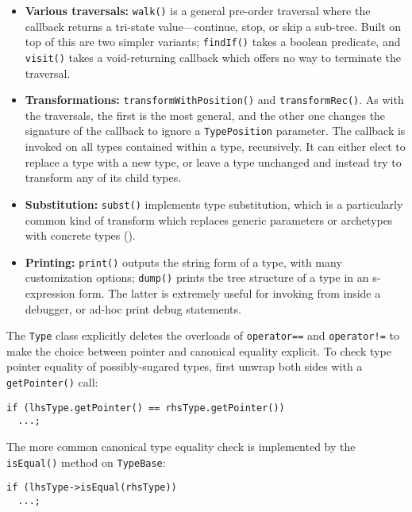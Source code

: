 \documentclass[../generics]{subfiles}
\begin{document}
\begin{itemize}
\item \textbf{Various traversals:} \texttt{walk()} is a general pre-order traversal where the callback returns a tri-state value---continue, stop, or skip a sub-tree. Built on top of this are two simpler variants; \texttt{findIf()} takes a boolean predicate, and \texttt{visit()} takes a void-returning callback which offers no way to terminate the traversal.
\item \textbf{Transformations:} \texttt{transformWithPosition()} and \texttt{transformRec()}. As with the traversals, the first is the most general, and the other one changes the signature of the callback to ignore a \texttt{TypePosition} parameter. The callback is invoked on all types contained within a type, recursively. It can either elect to replace a type with a new type, or leave a type unchanged and instead try to transform any of its child types.
\item \textbf{Substitution:} \texttt{subst()} implements type substitution, which is a particularly common kind of transform which replaces generic parameters or archetypes with concrete types ().
\item \textbf{Printing:} \texttt{print()} outputs the string form of a type, with many customization options; \texttt{dump()} prints the tree structure of a type in an s-expression form. The latter is extremely useful for invoking from inside a debugger, or ad-hoc print debug statements.
\end{itemize}
The \texttt{Type} class explicitly deletes the overloads of \texttt{operator==} and \texttt{operator!=} to make the choice between pointer and canonical equality explicit. To check type pointer equality of possibly-sugared types, first unwrap both sides with a \texttt{getPointer()} call:
\begin{Verbatim}
if (lhsType.getPointer() == rhsType.getPointer())
  ...;
\end{Verbatim}
The more common canonical type equality check is implemented by the \texttt{isEqual()} method on \texttt{TypeBase}:
\begin{Verbatim}
if (lhsType->isEqual(rhsType))
  ...;
\end{Verbatim}
\end{document}
